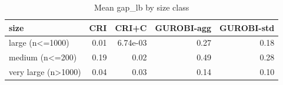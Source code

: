 \begin{table}[htbp]
\centering
\small
\caption{Mean gap\_lb by size class}
\label{tab:E3_long_runs_b600_by_size}
\begin{tabular}{lrrrr}
\toprule
size & CRI & CRI+C & GUROBI-agg & GUROBI-std \\
\midrule
large (n<=1000) & 0.01 & 6.74e-03 & 0.27 & 0.18 \\
medium (n<=200) & 0.19 & 0.02 & 0.49 & 0.28 \\
very large (n>1000) & 0.04 & 0.03 & 0.14 & 0.10 \\
\bottomrule
\end{tabular}
\end{table}
